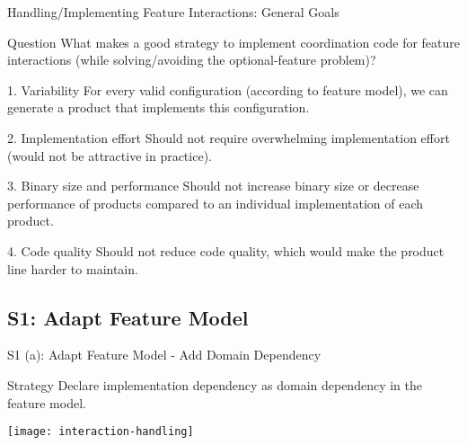 \begin{frame}{Handling/Implementing Feature Interactions: General Goals}
	\begin{note}{Question}
		What makes a good strategy to implement coordination code for feature interactions (while solving/avoiding the optional-feature problem)?
	\end{note}
	\pause
	\begin{mycolumns}[widths={50,50},animation=none]
		\begin{definition}{1. Variability}
			For every valid configuration (according to feature model), we can generate a product that implements this configuration.
		\end{definition}
		\pause
		\begin{definition}{2. Implementation effort}
			Should not require overwhelming implementation effort (would not be attractive in practice).
		\end{definition}
		\pause
	\mynextcolumn
		\begin{definition}{3. Binary size and performance}
			Should not increase binary size or decrease performance of products compared to an individual implementation of each product.
		\end{definition}
		\pause
		\begin{definition}{4. Code quality}
			Should not reduce code quality, which would make the product line harder to maintain. 
		\end{definition}
	\end{mycolumns}
\end{frame}

\subsection{S1: Adapt Feature Model}

\begin{frame}{S1 (a): Adapt Feature Model - Add Domain Dependency}
	\begin{definition}{Strategy}
		Declare implementation dependency as domain dependency in the feature model.
	\end{definition}
	\begin{notetight}{}
		\centering\texttt{[image: interaction-handling]}
	\end{notetight}
\end{frame}

